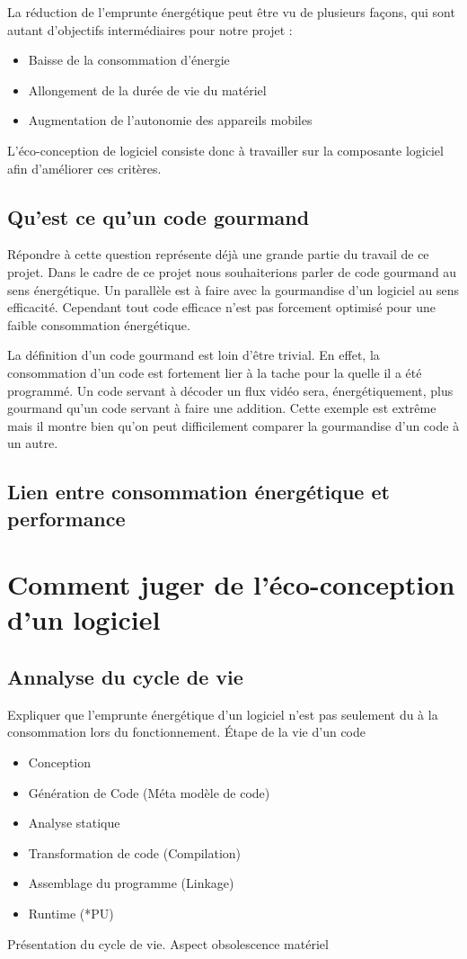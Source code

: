 \documentclass[a4paper, 11pt]{report}
\begin{document}
La réduction de l’emprunte énergétique peut être vu de plusieurs façons, qui sont autant d’objectifs intermédiaires pour notre projet :
\begin{itemize}
	\item Baisse de la consommation d’énergie
	\item Allongement de la durée de vie du matériel
	\item Augmentation de l’autonomie des appareils mobiles
\end{itemize}

L’éco-conception de logiciel consiste donc à travailler sur la composante logiciel afin d’améliorer ces critères.

\subsection{Qu'est ce qu'un code gourmand}
Répondre à cette question représente déjà une grande partie du travail de ce projet. Dans le cadre de ce projet nous souhaiterions parler de code gourmand au sens énergétique. Un parallèle est à faire avec la gourmandise d’un logiciel au sens efficacité. Cependant tout code efficace n’est pas forcement optimisé pour une faible consommation énergétique.

La définition d’un code gourmand est loin d’être trivial. En effet, la consommation d’un code est fortement lier à la tache pour la quelle il a été programmé. Un code servant à décoder un flux vidéo sera, énergétiquement, plus gourmand qu’un code servant à faire une addition. Cette exemple est extrême mais il montre bien qu’on peut difficilement comparer la gourmandise d’un code à un autre.

\subsection{Lien entre consommation énergétique et performance}

\section{Comment juger de l'éco-conception d'un logiciel}
\subsection{Annalyse du cycle de vie}
Expliquer que l’emprunte énergétique d’un logiciel n’est pas seulement du à la consommation lors du fonctionnement.
Étape de la vie d’un code
\begin{itemize}
	\item Conception
	\item Génération de Code (Méta modèle de code)
	\item Analyse statique
	\item Transformation de code (Compilation)
	\item Assemblage du programme (Linkage)
	\item Runtime (*PU)
\end{itemize}
Présentation du cycle de vie.
Aspect obsolescence matériel
\end{document}
